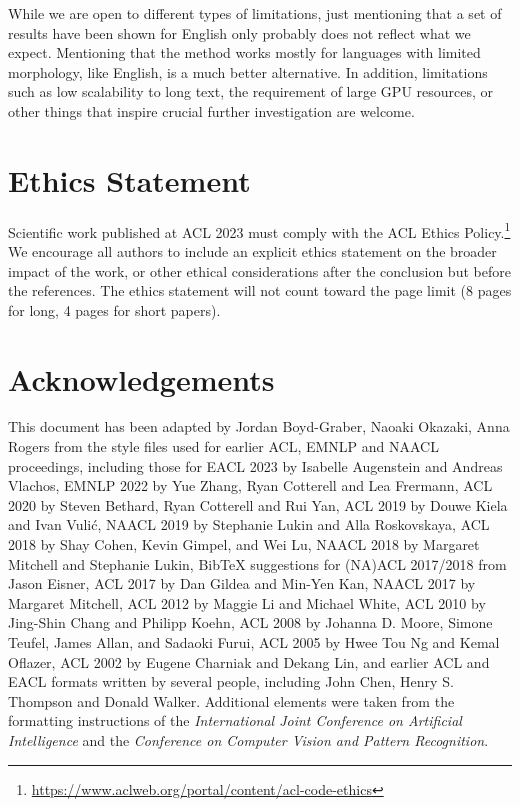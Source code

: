 \documentclass[11pt]{article}
\begin{document}
While we are open to different types of limitations, just mentioning that a set of results have been shown for English only probably does not reflect what we expect. 
Mentioning that the method works mostly for languages with limited morphology, like English, is a much better alternative.
In addition, limitations such as low scalability to long text, the requirement of large GPU resources, or other things that inspire crucial further investigation are welcome.

\section*{Ethics Statement}
Scientific work published at ACL 2023 must comply with the ACL Ethics Policy.\footnote{\url{https://www.aclweb.org/portal/content/acl-code-ethics}} We encourage all authors to include an explicit ethics statement on the broader impact of the work, or other ethical considerations after the conclusion but before the references. The ethics statement will not count toward the page limit (8 pages for long, 4 pages for short papers).

\section*{Acknowledgements}
This document has been adapted by Jordan Boyd-Graber, Naoaki Okazaki, Anna Rogers from the style files used for earlier ACL, EMNLP and NAACL proceedings, including those for
EACL 2023 by Isabelle Augenstein and Andreas Vlachos,
EMNLP 2022 by Yue Zhang, Ryan Cotterell and Lea Frermann,
ACL 2020 by Steven Bethard, Ryan Cotterell and Rui Yan,
ACL 2019 by Douwe Kiela and Ivan Vuli\'{c},
NAACL 2019 by Stephanie Lukin and Alla Roskovskaya, 
ACL 2018 by Shay Cohen, Kevin Gimpel, and Wei Lu, 
NAACL 2018 by Margaret Mitchell and Stephanie Lukin,
Bib\TeX{} suggestions for (NA)ACL 2017/2018 from Jason Eisner,
ACL 2017 by Dan Gildea and Min-Yen Kan, NAACL 2017 by Margaret Mitchell, 
ACL 2012 by Maggie Li and Michael White, 
ACL 2010 by Jing-Shin Chang and Philipp Koehn, 
ACL 2008 by Johanna D. Moore, Simone Teufel, James Allan, and Sadaoki Furui, 
ACL 2005 by Hwee Tou Ng and Kemal Oflazer, 
ACL 2002 by Eugene Charniak and Dekang Lin, 
and earlier ACL and EACL formats written by several people, including
John Chen, Henry S. Thompson and Donald Walker.
Additional elements were taken from the formatting instructions of the \emph{International Joint Conference on Artificial Intelligence} and the \emph{Conference on Computer Vision and Pattern Recognition}.
\end{document}
